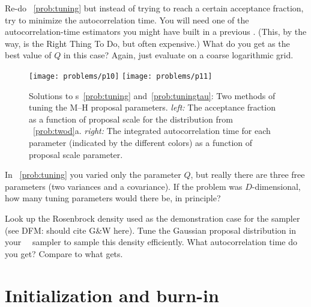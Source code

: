 \documentclass[12pt,twoside,pdftex]{article}
\newcommand{\MCMC}{\acronym{MCMC}}
\newcommand{\MH}{\acronym{M--H}}
\begin{document}
\begin{problem}\label{prob:tuningtau}
Re-do \problemname~\ref{prob:tuning} but instead of trying to reach a
certain acceptance fraction, try to minimize the autocorrelation time.
You will need one of the autocorrelation-time estimators you might have
built in a previous \problemname.
(This, by the way, is the Right Thing To Do, but often expensive.)
What do you get as the best value of $Q$ in this case?
Again, just evaluate on a coarse logarithmic grid.
\end{problem}

\begin{figure}[!htbp]
\begin{center}
\texttt{[image: problems/p10]}
\texttt{[image: problems/p11]}
\end{center}
\caption{Solutions to \problemname s~\ref{prob:tuning} and~\ref{prob:tuningtau}:
Two methods of tuning the M--H proposal parameters.
\emph{left:} The acceptance fraction as a function of proposal scale for the
distribution from \problemname~\ref{prob:twod}a.
\emph{right:} The integrated autocorrelation time for each parameter
(indicated by the different colors) as a function of proposal scale parameter.}
\label{fig:tuning}
\end{figure}

\begin{problem}
In \problemname~\ref{prob:tuning} you varied only the parameter $Q$, but
really there are three free parameters (two variances and a covariance).
If the problem was $D$-dimensional, how many tuning parameters would there
be, in principle?
\end{problem}

\begin{problem}\label{prob:rosenbrock}
Look up the Rosenbrock density used as the demonstration case for the
 sampler (see DFM: should cite G\&W here).
Tune the Gaussian proposal distribution in your \MH\ \MCMC\ sampler to sample this density efficiently.
What autocorrelation time do you get?
Compare to what  gets.
\end{problem}

\section{Initialization and burn-in}\label{sec:initialization}
\end{document}
